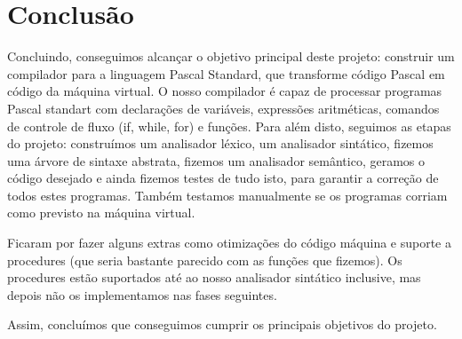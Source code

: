 \documentclass[12pt,a4paper]{report}
\begin{document}
\chapter{Conclusão}

Concluindo, conseguimos alcançar o objetivo principal deste projeto: construir um compilador para a linguagem Pascal Standard, que transforme código Pascal em código da máquina virtual.
O nosso compilador é capaz de processar programas Pascal standart com declarações de variáveis, expressões aritméticas, comandos de controle de fluxo (if, while, for) e funções. Para além disto,
seguimos as etapas do projeto: construímos um analisador léxico, um analisador sintático, fizemos uma árvore de sintaxe abstrata, fizemos um analisador semântico, geramos o código desejado
e ainda fizemos testes de tudo isto, para garantir a correção de todos estes programas. Também testamos manualmente se os programas corriam como previsto na máquina virtual.

\vspace{1em}

Ficaram por fazer alguns extras como otimizações do código máquina e suporte a procedures (que seria bastante parecido
com as funções que fizemos).
Os procedures estão suportados até ao nosso analisador sintático inclusive, mas depois não os implementamos nas fases seguintes.

\vspace{1em}

Assim, concluímos que conseguimos cumprir os principais objetivos do projeto. 
\end{document}
